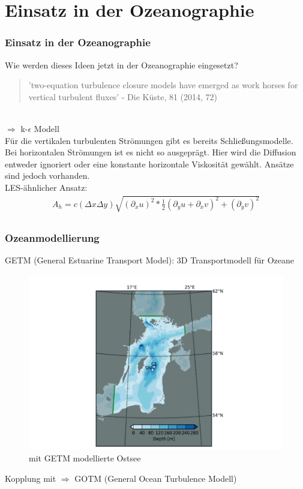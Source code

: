 \documentclass[11pt,t]{beamer}
\begin{document}
\section{Einsatz in der Ozeanographie}
\begin{frame}
\frametitle{Einsatz in der Ozeanographie}
Wie werden dieses Ideen jetzt in der Ozeanographie eingesetzt?
\begin{quote}
'two-equation turbulence closure models have emerged as work horses for vertical turbulent fluxes' - Die Küste, 81 (2014, 72)
\end{quote}
\\
$\Rightarrow$ k-$\epsilon$ Modell\\
\vspace{0.5cm}
Für die vertikalen turbulenten Strömungen gibt es bereits Schließungsmodelle.
Bei horizontalen Strömungen ist es nicht so ausgeprägt. Hier wird die Diffusion entweder ignoriert oder eine konstante horizontale Viskosität gewählt. Ansätze sind jedoch vorhanden.\\
LES-ähnlicher Ansatz:
\begin{align*}
A_h=c(\Delta x\Delta y)\sqrt{(\partial_x u)^2*\frac{1}{2}(\partial_y u+ \partial_x v)^2 + (\partial_y v)^2}
\\
\end{align*}
\end{frame}
\begin{frame}
\frametitle{Ozeanmodellierung}
GETM  (General Estuarine Transport Model): 3D Transportmodell für Ozeane\\
\begin{figure}
\includegraphics[width=0.7\linewidth]{images/getm.png}
\caption{mit GETM modellierte Ostsee}
\end{figure}
Kopplung mit $\Rightarrow$ GOTM (General Ocean Turbulence Modell)
\end{frame}
\end{document}
